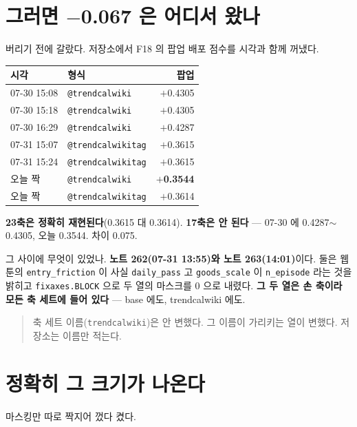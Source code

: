 \documentclass[10pt]{article}
\begin{document}
\section{그러면 $-$0.067 은 어디서 왔나}

버리기 전에 갈랐다. 저장소에서 F18 의 팝업 배포 점수를 시각과 함께
꺼냈다.

\begin{center}\small
\begin{tabular}{llr}
\hline
시각 & 형식 & 팝업 \\
\hline
07-30 15:08 & \texttt{@trendcalwiki} & $+$0.4305 \\
07-30 15:18 & \texttt{@trendcalwiki} & $+$0.4305 \\
07-30 16:29 & \texttt{@trendcalwiki} & $+$0.4287 \\
07-31 15:07 & \texttt{@trendcalwikitag} & $+$0.3615 \\
07-31 15:24 & \texttt{@trendcalwikitag} & $+$0.3615 \\
\hline
오늘 짝 & \texttt{@trendcalwiki} & \textbf{$+$0.3544} \\
오늘 짝 & \texttt{@trendcalwikitag} & $+$0.3614 \\
\hline
\end{tabular}
\end{center}

\textbf{23축은 정확히 재현된다}(0.3615 대 0.3614). \textbf{17축은 안 된다}
--- 07-30 에 0.4287$\sim$0.4305, 오늘 0.3544. 차이 0.075.

그 사이에 무엇이 있었나. \textbf{노트 262(07-31 13:55)와 노트
263(14:01)}이다. 둘은 웹툰의 \texttt{entry\_friction} 이 사실
\texttt{daily\_pass} 고 \texttt{goods\_scale} 이 \texttt{n\_episode} 라는
것을 밝히고 \texttt{fixaxes.BLOCK} 으로 두 열의 마스크를 0 으로 내렸다.
\textbf{그 두 열은 손 축이라 모든 축 세트에 들어 있다} --- base 에도,
trendcalwiki 에도.

\begin{quote}\small
축 세트 이름(\texttt{trendcalwiki})은 안 변했다. 그 이름이 가리키는 열이
변했다. 저장소는 이름만 적는다.
\end{quote}

\section{정확히 그 크기가 나온다}

마스킹만 따로 짝지어 껐다 켰다.
\end{document}
